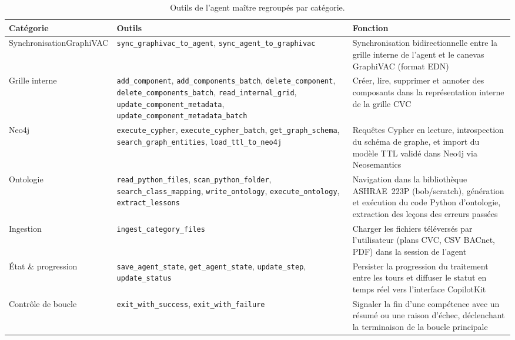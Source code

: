 \begin{table}[htbp]
  \caption{Outils de l'agent maître regroupés par catégorie.}
  \label{tab:tools}
  \centering
  \small
  \begin{tabular}{p{3.2cm}p{4.5cm}p{6.5cm}}
    \toprule
    \textbf{Catégorie} & \textbf{Outils} & \textbf{Fonction} \\
    \midrule
    Synchronisation\newline GraphiVAC
      & \texttt{sync\_graphivac\_to\_agent},
        \texttt{sync\_agent\_to\_graphivac}
      & Synchronisation bidirectionnelle entre la grille interne de l'agent et le canevas GraphiVAC (format EDN) \\
    \addlinespace
    Grille interne
      & \texttt{add\_component},
        \texttt{add\_components\_batch},
        \texttt{delete\_component},
        \texttt{delete\_components\_batch},
        \texttt{read\_internal\_grid},
        \texttt{update\_component\_metadata},
        \texttt{update\_component\_metadata\_batch}
      & Créer, lire, supprimer et annoter des composants dans la représentation interne de la grille CVC \\
    \addlinespace
    Neo4j
      & \texttt{execute\_cypher},
        \texttt{execute\_cypher\_batch},
        \texttt{get\_graph\_schema},
        \texttt{search\_graph\_entities},
        \texttt{load\_ttl\_to\_neo4j}
      & Requêtes Cypher en lecture, introspection du schéma de graphe, et import du modèle TTL validé dans Neo4j via Neosemantics \\
    \addlinespace
    Ontologie
      & \texttt{read\_python\_files},
        \texttt{scan\_python\_folder},
        \texttt{search\_class\_mapping},
        \texttt{write\_ontology},
        \texttt{execute\_ontology},
        \texttt{extract\_lessons}
      & Navigation dans la bibliothèque ASHRAE~223P (bob/scratch), génération et exécution du code Python d'ontologie, extraction des leçons des erreurs passées \\
    \addlinespace
    Ingestion
      & \texttt{ingest\_category\_files}
      & Charger les fichiers téléversés par l'utilisateur (plans CVC, CSV BACnet, PDF) dans la session de l'agent \\
    \addlinespace
    État \& progression
      & \texttt{save\_agent\_state},
        \texttt{get\_agent\_state},
        \texttt{update\_step},
        \texttt{update\_status}
      & Persister la progression du traitement entre les tours et diffuser le statut en temps réel vers l'interface CopilotKit \\
    \addlinespace
    Contrôle de boucle
      & \texttt{exit\_with\_success},
        \texttt{exit\_with\_failure}
      & Signaler la fin d'une compétence avec un résumé ou une raison d'échec, déclenchant la terminaison de la boucle principale \\
    \bottomrule
  \end{tabular}
\end{table}

